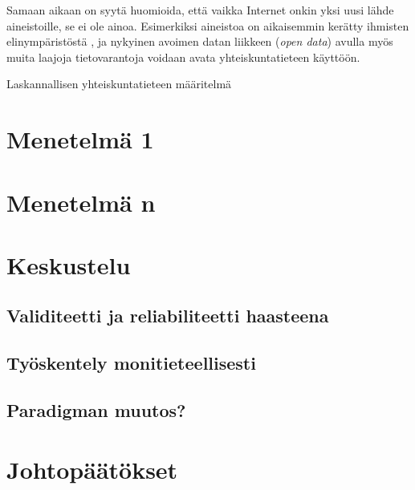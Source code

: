 \documentclass[finnish,gradu,twoside,12pt]{tktltiki}
\begin{document}
Samaan aikaan on syytä huomioida, että vaikka Internet onkin yksi uusi lähde aineistoille, se ei ole ainoa. Esimerkiksi aineistoa on aikaisemmin kerätty ihmisten elinympäristöstä \citep{eagle06,oulasvirta12}, ja nykyinen avoimen datan liikkeen (\textit{open data}) avulla myös muita laajoja tietovarantoja voidaan avata yhteiskuntatieteen käyttöön.

Laskannallisen yhteiskuntatieteen määritelmä

\section{Menetelmä 1}

\section{Menetelmä n}

\section{Keskustelu}

\subsection{Validiteetti ja reliabiliteetti haasteena}

\subsection{Työskentely monitieteellisesti}

\subsection{Paradigman muutos?}

\section{Johtopäätökset}


  
\end{document}
